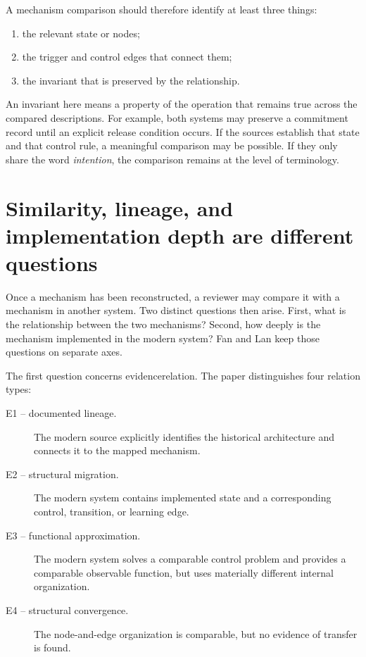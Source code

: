 A mechanism comparison should therefore identify at least three things:
\begin{enumerate}
  \item the relevant state or nodes;
  \item the trigger and control edges that connect them;
  \item the invariant that is preserved by the relationship.
\end{enumerate}

An invariant here means a property of the operation that remains true across the compared descriptions. For example, both systems may preserve a commitment record until an explicit release condition occurs. If the sources establish that state and that control rule, a meaningful comparison may be possible. If they only share the word \emph{intention}, the comparison remains at the level of terminology.

\section{Similarity, lineage, and implementation depth are different questions}
\label{sec:similarity-lineage-depth}

Once a mechanism has been reconstructed, a reviewer may compare it with a mechanism in another system. Two distinct questions then arise. First, what is the relationship between the two mechanisms? Second, how deeply is the mechanism implemented in the modern system? Fan and Lan keep those questions on separate axes.

The first question concerns \gls{evidencerelation}. The paper distinguishes four relation types:
\begin{description}
  \item[E1 -- documented lineage.] The modern source explicitly identifies the historical architecture and connects it to the mapped mechanism.
  \item[E2 -- structural migration.] The modern system contains implemented state and a corresponding control, transition, or learning edge.
  \item[E3 -- functional approximation.] The modern system solves a comparable control problem and provides a comparable observable function, but uses materially different internal organization.
  \item[E4 -- structural convergence.] The node-and-edge organization is comparable, but no evidence of transfer is found.
\end{description}

